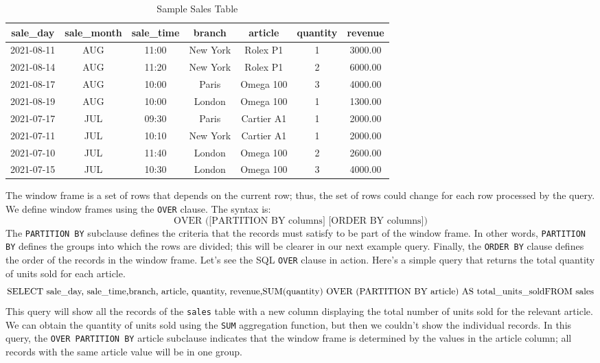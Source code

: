 \documentclass{article}
\begin{document}
\begin{table}[h]
    \centering
    \begin{tabular}{|c|c|c|c|c|c|c|}
        \hline
        sale\_day  & sale\_month & sale\_time & branch   & article    & quantity & revenue \\
        \hline
        2021-08-11 & AUG         & 11:00      & New York & Rolex P1   & 1        & 3000.00 \\
        2021-08-14 & AUG         & 11:20      & New York & Rolex P1   & 2        & 6000.00 \\
        2021-08-17 & AUG         & 10:00      & Paris    & Omega 100  & 3        & 4000.00 \\
        2021-08-19 & AUG         & 10:00      & London   & Omega 100  & 1        & 1300.00 \\
        2021-07-17 & JUL         & 09:30      & Paris    & Cartier A1 & 1        & 2000.00 \\
        2021-07-11 & JUL         & 10:10      & New York & Cartier A1 & 1        & 2000.00 \\
        2021-07-10 & JUL         & 11:40      & London   & Omega 100  & 2        & 2600.00 \\
        2021-07-15 & JUL         & 10:30      & London   & Omega 100  & 3        & 4000.00 \\
        \hline
    \end{tabular}
    \caption{Sample Sales Table}
\end{table}

The window frame is a set of rows that depends on the current row; thus, the
set of rows could change for each row processed by the query. We define window
frames using the \texttt{OVER} clause. The syntax is:
\[
    \text{OVER ([PARTITION BY columns] [ORDER BY columns])}
\]
The \texttt{PARTITION BY} subclause defines the criteria that the records must
satisfy to be part of the window frame. In other words, \texttt{PARTITION BY}
defines the groups into which the rows are divided; this will be clearer in our
next example query. Finally, the \texttt{ORDER BY} clause defines the order of
the records in the window frame.
Let’s see the SQL \texttt{OVER} clause in action. Here’s a simple query that
returns the total quantity of units sold for each article.
\[
    \text{SELECT sale\_day, sale\_time,} \\
    \text{branch, article, quantity, revenue,} \\
    \text{SUM(quantity) OVER (PARTITION BY article) AS total\_units\_sold} \\
    \text{FROM sales}
\]
This query will show all the records of the \texttt{sales} table with a new
column displaying the total number of units sold for the relevant article. We
can obtain the quantity of units sold using the \texttt{SUM} aggregation
function, but then we couldn’t show the individual records.
In this query, the \texttt{OVER PARTITION BY} article subclause indicates that
the window frame is determined by the values in the article column; all records
with the same article value will be in one group.
\end{document}
